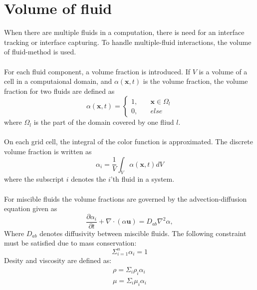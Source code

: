 \documentclass[a4paper, 12pt]{report}
\begin{document}
\section{Volume of fluid}
When there are multiple fluids in a computation, there is need for an interface tracking or interface capturing. To handle multiple-fluid interactions, the volume of fluid-method is used.\\
\\
For each fluid component, a volume fraction is introduced. If $V$ is a volume of a cell in a computaional domain, and $\alpha(\mathbf{x}, t)$ is the volume fraction, the volume fraction for two fluids are defined as \citep{VOF2}
\begin{equation}
\alpha(\mathbf{x},t) = \left\{
        \begin{array}{ll}
            1, & \quad \mathbf{x} \in \Omega_l \\
            0, & \quad else
        \end{array}
    \right.
\label{eqn:volumeFraction}    
\end{equation}
where $\Omega_l$ is the part of the domain covered by one fliud $l$.\\
\\
On each grid cell, the integral of the color function is approximated. The discrete volume fraction is written as \citep{VOF2}
\begin{equation}
\alpha_i = \frac{1}{V} \int_{V} \alpha(\mathbf{x},t) dV
\end{equation}
where the subscript $i$ denotes the $i$'th fluid in a system.\\
\\
For miscible fluids the volume fractions are governed by the advection-diffusion equation given as \citep{VOF1}
\begin{equation}
\frac{\partial \alpha_i}{\partial t} + \nabla \cdot (\alpha \mathbf{u}) = D_{ab}\nabla^2 \alpha,
\label{eqn:alphadiffusionEquation}
\end{equation} 
Where $D_{ab}$ denotes diffusivity between miscible fluids. The following constraint must be satisfied due to mass conservation:
\begin{equation}
\Sigma_{i=1}^n \alpha_i= 1
\label{eqn:alphaConstraint} 
\end{equation}
Desity and viscosity are defined as:
\begin{eqnarray}
\label{eqn:alphaRhodiffusion}
\rho = \Sigma_i \rho_i \alpha_i \\
\label{eqn:alphaMudiffusion}
\mu = \Sigma_i \mu_i \alpha_i
\end{eqnarray}
\end{document}
